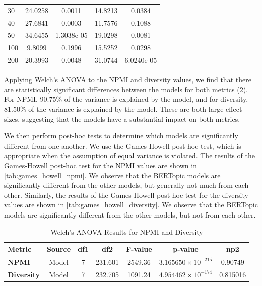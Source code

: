 \begin{table}[htbp]
\begin{tabular}{@{}lcc|cc@{}}
        30                  & 24.0258                           & 0.0011                                 & 14.8213            & 0.0384           \\
        40                  & 27.6841                           & 0.0003                                 & 11.7576            & 0.1088           \\
        50                  & 34.6455                           & 1.3038e-05                             & 19.0298            & 0.0081           \\
        100                 & 9.8099                            & 0.1996                                 & 15.5252            & 0.0298           \\
        200                 & 20.3993                           & 0.0048                                 & 31.0744            & 6.0240e-05       \\ \bottomrule
    \end{tabular}
    \label{tab:levene_bartlett}
\end{table}

Applying Welch's ANOVA to the NPMI and diversity values, we find that there are statistically significant differences between the models for both metrics (\cref{tab:welch_anova}). For NPMI, 90.75\% of the variance is explained by the model, and for diversity, 81.50\% of the variance is explained by the model. These are both large effect sizes, suggesting that the models have a substantial impact on both metrics.

We then perform post-hoc tests to determine which models are significantly different from one another. We use the Games-Howell post-hoc test, which is appropriate when the assumption of equal variance is violated. The results of the Games-Howell post-hoc test for the NPMI values are shown in \cref{tab:games_howell_npmi}. We observe that the BERTopic models are significantly different from the other models, but generally not much from each other. Similarly, the results of the Games-Howell post-hoc test for the diversity values are shown in \cref{tab:games_howell_diversity}. We observe that the BERTopic models are significantly different from the other models, but not from each other.

\begin{table}[ht]
    \centering
    \caption{Welch's ANOVA Results for NPMI and Diversity}
    \label{tab:welch_anova}
    \begin{tabular}{lcccccc}
        \toprule
        \textbf{Metric}    & \textbf{Source} & \textbf{df1} & \textbf{df2} & \textbf{F-value} & \textbf{p-value}            & \textbf{np2} \\
        \midrule
        \textbf{NPMI}      & Model           & 7            & 231.601      & 2549.36          & $3.165650 \times 10^{-215}$ & 0.90749      \\
        \textbf{Diversity} & Model           & 7            & 232.705      & 1091.24          & $4.954462 \times 10^{-174}$ & 0.815016     \\
        \bottomrule
    \end{tabular}
\end{table}

